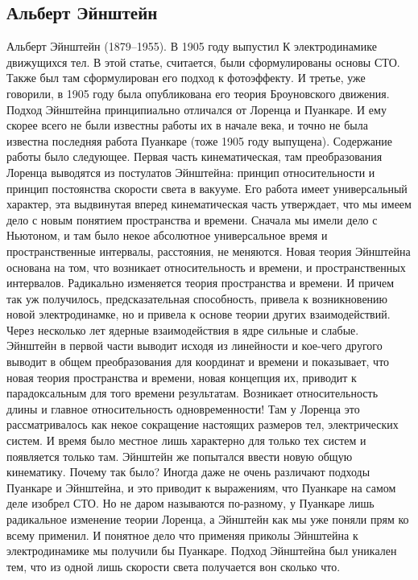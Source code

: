 \documentclass[a4paper, 12pt]{article}
\begin{document}
\subsection{Альберт Эйнштейн}

Альберт Эйнштейн (1879--1955). В 1905 году выпустил К электродинамике 
движущихся тел. В этой статье, считается, были сформулированы основы 
СТО. Также был там сформулирован его подход к фотоэффекту. И третье, уже 
говорили, в 1905 году была опубликована его теория Броуновского 
движения. Подход Эйнштейна принципиально отличался от Лоренца 
и Пуанкаре. И ему скорее всего не были известны работы их в начале века, 
и точно не была известна последняя работа Пуанкаре (тоже 1905 году 
выпущена). Содержание работы было следующее. Первая часть 
кинематическая, там преобразования Лоренца выводятся из постулатов 
Эйнштейна: принцип относительности и принцип постоянства скорости света 
в вакууме. Его работа имеет универсальный характер, эта выдвинутая 
вперед кинематическая часть утверждает, что мы имеем дело с новым 
понятием пространства и времени. Сначала мы имели дело с Ньютоном, и там 
было некое абсолютное универсальное время и пространственные интервалы, 
расстояния, не меняются. Новая теория Эйнштейна основана на том, что 
возникает относительность и времени, и пространственных интервалов. 
Радикально изменяется теория пространства и времени. И причем так уж 
получилось, предсказательная способность, привела к возникновению новой 
электродинамке, но и привела к основе теории других взаимодействий. 
Через несколько лет ядерные взаимодействия в ядре сильные и слабые. 
Эйнштейн в первой части выводит исходя из линейности и кое-чего другого 
выводит в общем преобразования для координат и времени и показывает, что 
новая теория пространства и времени, новая концепция их, приводит 
к парадоксальным для того времени результатам. Возникает относительность 
длины и главное относительность одновременности! Там у Лоренца это 
рассматривалось как некое сокращение настоящих размеров тел, 
электрических систем. И время было местное лишь характерно для только 
тех систем и появляется только там. Эйнштейн же попытался ввести новую 
общую кинематику. Почему так было? Иногда даже не очень различают 
подходы Пуанкаре и Эйнштейна, и это приводит к выражениям, что Пуанкаре 
на самом деле изобрел СТО. Но не даром называются по-разному, у Пуанкаре 
лишь радикальное изменение теории Лоренца, а Эйнштейн как мы уже поняли 
прям ко всему применил. И понятное дело что применяя приколы Эйнштейна 
к электродинамике мы получили бы Пуанкаре. Подход Эйнштейна был уникален 
тем, что из одной лишь скорости света получается вон сколько что.
\end{document}
